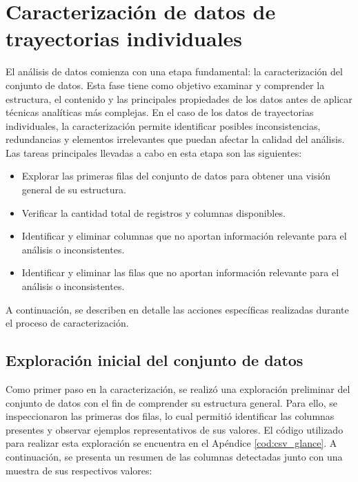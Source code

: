 \section{Caracterización de datos de trayectorias individuales}
\label{sec:caracterizacion}
El análisis de datos comienza con una etapa fundamental: la caracterización del conjunto de datos. Esta fase tiene como objetivo examinar y comprender la estructura, el contenido y las principales propiedades de los datos antes de aplicar técnicas analíticas más complejas. 
En el caso de los datos de trayectorias individuales, la caracterización permite identificar posibles inconsistencias, redundancias y elementos irrelevantes que puedan afectar la calidad del análisis. Las tareas principales llevadas a cabo en esta etapa son las siguientes:
\begin{itemize}
    \item Explorar las primeras filas del conjunto de datos para obtener una visión general de su estructura.
    \item Verificar la cantidad total de registros y columnas disponibles.
    \item Identificar y eliminar columnas que no aportan información relevante para el análisis o inconsistentes.
    \item Identificar y eliminar las filas que no aportan información relevante para el análisis o inconsistentes.
\end{itemize}
A continuación, se describen en detalle las acciones específicas realizadas durante el proceso de caracterización.
\vfill

\subsection{Exploración inicial del conjunto de datos}
\label{subsec:exploracion_inicial}
Como primer paso en la caracterización, se realizó una exploración preliminar del conjunto de datos con el fin de comprender su estructura general. Para ello, se inspeccionaron las primeras dos filas, lo cual permitió identificar las columnas presentes y observar ejemplos representativos de sus valores.
El código utilizado para realizar esta exploración se encuentra en el Apéndice \ref{cod:csv_glance}. A continuación, se presenta un resumen de las columnas detectadas junto con una muestra de sus respectivos valores:

